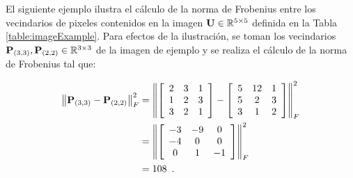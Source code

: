{El siguiente ejemplo ilustra el c\'alculo de la norma de Frobenius entre los vecindarios de pixeles contenidos en la imagen $\mathbf{U} \in\mathbb{R}^{5 \times 5}$ definida en la Tabla \ref{table:imageExample}. Para efectos de la ilustraci\'on, se toman los vecindarios $\mathbf{P}_{\left(3,3\right)},\mathbf{P}_{\left(2,2\right)} \in\mathbb{R}^{3\times3}$ de la imagen de ejemplo   y se realiza  el c\'alculo de la norma de Frobenius tal que:


\begin{equation}
\label{eq:resultado1}
\begin{split}
\left\Vert \mathbf{P}_{\left(3,3\right)}-\mathbf{P}_{\left(2,2\right)}\right\Vert_{F} ^{2} & =\left\Vert \left[\begin{array}{ccc}
2 & 3 & 1\\
1 & 2 & 3\\
3 & 2 & 1
\end{array} \right]-\left[\begin{array}{ccc}
5 & 12 & 1\\
5 & 2 & 3\\
3 & 1 & 2
\end{array}\right]\right\Vert_{F}^2 \\
& =\left\Vert\left[\begin{array}{ccc}
-3 & -9 & 0\\
-4 & 0 & 0\\
0 & 1 & -1
\end{array}\right]\right\Vert_{F}^2 \\
& =108 \enspace .
\end{split}
\end{equation}



}
